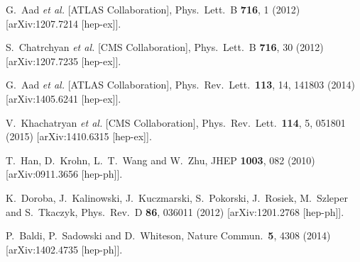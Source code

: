  G.~Aad {\it et al.}  [ATLAS Collaboration],
  Phys.\ Lett.\ B {\bf 716}, 1 (2012)
  [arXiv:1207.7214 [hep-ex]].


  S.~Chatrchyan {\it et al.}  [CMS Collaboration],
  Phys.\ Lett.\ B {\bf 716}, 30 (2012)
  [arXiv:1207.7235 [hep-ex]].

  G.~Aad {\it et al.}  [ATLAS Collaboration],
  Phys.\ Rev.\ Lett.\  {\bf 113}, 14, 141803 (2014)
  [arXiv:1405.6241 [hep-ex]].


  V.~Khachatryan {\it et al.}  [CMS Collaboration],
  Phys.\ Rev.\ Lett.\  {\bf 114}, 5, 051801 (2015)
  [arXiv:1410.6315 [hep-ex]].


  T.~Han, D.~Krohn, L.~T.~Wang and W.~Zhu,
  JHEP {\bf 1003}, 082 (2010)
  [arXiv:0911.3656 [hep-ph]].

  K.~Doroba, J.~Kalinowski, J.~Kuczmarski, S.~Pokorski, J.~Rosiek, M.~Szleper and S.~Tkaczyk,
  Phys.\ Rev.\ D {\bf 86}, 036011 (2012)
  [arXiv:1201.2768 [hep-ph]].

  P.~Baldi, P.~Sadowski and D.~Whiteson,
  Nature Commun.\  {\bf 5}, 4308 (2014)
  [arXiv:1402.4735 [hep-ph]].

